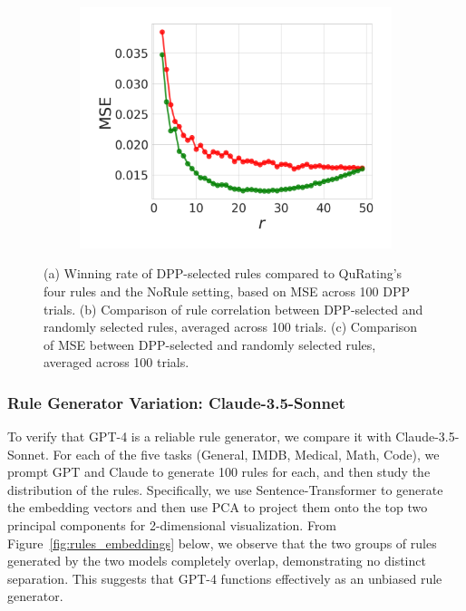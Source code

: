 \documentclass{article}
\begin{document}
\begin{figure}[H]
\begin{subfigure}{0.297\textwidth}
  \caption{}
  \label{fig:EvalA_IMDB_Single70B_dpp_vs_random_RC}
\end{subfigure}
\begin{subfigure}{0.3\textwidth}
  \centering
  \includegraphics[width=1.0\linewidth]{figures/EvalA_IMDB_Single70B_dpp_vs_random_MSE.pdf}
  \caption{}
  \label{fig:EvalA_IMDB_Single70B_dpp_vs_random_MSE}
\end{subfigure}
\caption{(a) Winning rate of DPP-selected rules compared to QuRating’s four rules and the NoRule setting, based on MSE across 100 DPP trials. (b) Comparison of rule correlation between DPP-selected and randomly selected rules, averaged across 100 trials. (c) Comparison of MSE between DPP-selected and randomly selected rules, averaged across 100 trials.}
\end{figure}


\subsubsection{Rule Generator Variation: Claude-3.5-Sonnet}
To verify that GPT-4 is a reliable rule generator, we compare it with Claude-3.5-Sonnet. For each of the five tasks (General, IMDB, Medical, Math, Code), we prompt GPT and Claude to generate 100 rules for each, and then study the distribution of the rules. Specifically, we use Sentence-Transformer \citep{reimers2019sentence} to generate the embedding vectors and then use PCA to project them onto the top two principal components for 2-dimensional visualization. From Figure~\ref{fig:rules_embeddings} below, we observe that the two groups of rules generated by the two models completely overlap, demonstrating no distinct separation. This suggests that GPT-4 functions effectively as an unbiased rule generator.
\end{document}
